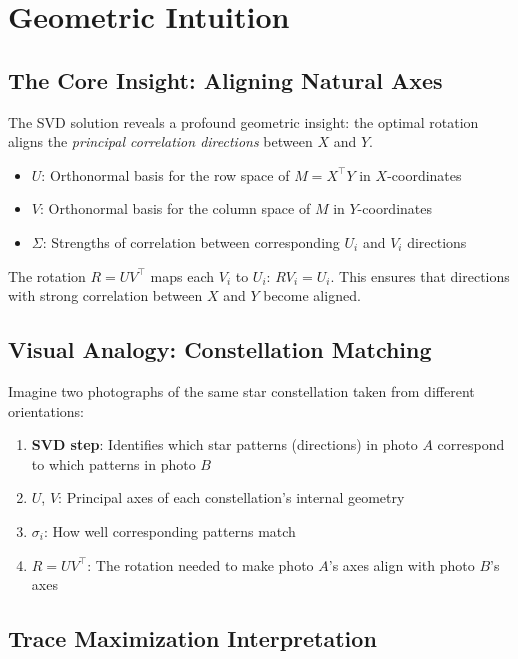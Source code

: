 \documentclass[11pt]{article}
\begin{document}
\section{Geometric Intuition}
\label{sec:intuition}

\subsection{The Core Insight: Aligning Natural Axes}
\label{subsec:core-insight}

The SVD solution reveals a profound geometric insight: the optimal rotation aligns the \textit{principal correlation directions} between $X$ and $Y$.

\begin{itemize}
    \item $U$: Orthonormal basis for the row space of $M = X^\top Y$ in $X$-coordinates
    \item $V$: Orthonormal basis for the column space of $M$ in $Y$-coordinates
    \item $\Sigma$: Strengths of correlation between corresponding $U_i$ and $V_i$ directions
\end{itemize}

The rotation $R = U V^\top$ maps each $V_i$ to $U_i$: $R V_i = U_i$. This ensures that directions with strong correlation between $X$ and $Y$ become aligned.

\subsection{Visual Analogy: Constellation Matching}
\label{subsec:analogy}

Imagine two photographs of the same star constellation taken from different orientations:
\begin{enumerate}
    \item \textbf{SVD step}: Identifies which star patterns (directions) in photo $A$ correspond to which patterns in photo $B$
    \item $U$, $V$: Principal axes of each constellation's internal geometry
    \item $\sigma_i$: How well corresponding patterns match
    \item $R = U V^\top$: The rotation needed to make photo $A$'s axes align with photo $B$'s axes
\end{enumerate}

\subsection{Trace Maximization Interpretation}
\label{subsec:trace-interpretation}
\end{document}
